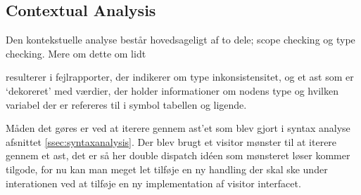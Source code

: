 \subsection{Contextual Analysis}\label{ssec:contextual}
    Den kontekstuelle analyse består hovedsageligt af to dele; scope checking og type checking. Mere om dette om lidt
    
resulterer i fejlrapporter, der indikerer om type inkonsistensitet, og et \gls{ast} som er \enquote*{dekoreret} med værdier, der holder informationer om nodens type og hvilken variabel der er refereres til i symbol tabellen og ligende. %
    
    Måden det gøres er ved at iterere gennem \gls{ast}'et som blev gjort i syntax analyse afsnittet \ref{ssec:syntaxanalysis}. Der blev brugt et visitor mønster til at iterere gennem et \gls{ast}, det er så her double dispatch idéen som mønsteret løser kommer tilgode, for nu kan man meget let tilføje en ny handling der skal ske under interationen ved at tilføje en ny implementation af visitor interfacet.